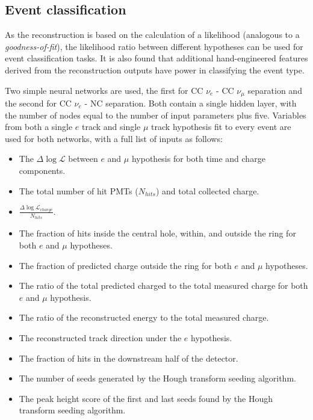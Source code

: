 \subsection{Event classification}%
\label{sec:cvn_old_pid} %

As the reconstruction is based on the calculation of a likelihood (analogous to a
\emph{goodness-of-fit}), the likelihood ratio between different hypotheses can be used for event
classification tasks. It is also found that additional hand-engineered features derived from the
reconstruction outputs have power in classifying the event type.

Two simple neural networks are used, the first for CC $\nu_{e}$ - CC $\nu_{\mu}$ separation and
the second for CC $\nu_{e}$ - NC separation. Both contain a single hidden layer, with the number
of nodes equal to the number of input parameters plus five. Variables from both a single $e$ track
and single $\mu$ track hypothesis fit to every event are used for both networks, with a full list
of inputs as follows:
\begin{itemize}
    \item The $\Delta\log\mathcal{L}$ between $e$ and $\mu$ hypothesis for both time and charge
          components.
    \item The total number of hit PMTs ($N_{hits}$) and total collected charge.
    \item $\frac{\Delta\log\mathcal{L}_{charge}}{N_{hits}}$.
    \item The fraction of hits inside the central hole, within, and outside the ring for both $e$
          and $\mu$ hypotheses.
    \item The fraction of predicted charge outside the ring for both $e$ and $\mu$ hypotheses.
    \item The ratio of the total predicted charged to the total measured charge for both $e$
          and $\mu$ hypothesis.
    \item The ratio of the reconstructed energy to the total measured charge.
    \item The reconstructed track direction under the $e$ hypothesis.
    \item The fraction of hits in the downstream half of the detector.
    \item The number of seeds generated by the Hough transform seeding algorithm.
    \item The peak height score of the first and last seeds found by the Hough transform seeding
          algorithm.
\end{itemize}

